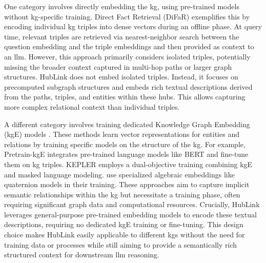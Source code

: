 One category involves directly embedding the \gls{kg}, using pre-trained models without \gls{kg}-specific training. Direct Fact Retrieval (DiFaR) \cite{baek_direct_2023} exemplifies this by encoding individual \gls{kg} triples into dense vectors during an offline phase. At query time, relevant triples are retrieved via nearest-neighbor search between the question embedding and the triple embeddings and then provided as context to an \gls{llm}. However, this approach primarily considers isolated triples, potentially missing the broader context captured in multi-hop paths or larger graph structures. HubLink does not embed isolated triples. Instead, it focuses on precomputed subgraph structures and embeds rich textual descriptions derived from the paths, triples, and entities within these hubs. This allows capturing more complex relational context than individual triples.

A different category involves training dedicated Knowledge Graph Embedding (\gls{kg}E) models \cite{cao_knowledge_2024, pan_unifying_2024}. These methods learn vector representations for entities and relations by training specific models on the structure of the \gls{kg}. For example, Pretrain-\gls{kg}E \cite{zhang_pretrain-kge_2020} integrates pre-trained language models like BERT and fine-tune them on \gls{kg} triples. KEPLER \cite{wang_kepler_2020} employs a dual-objective training combining \gls{kg}E and masked language modeling. \textcite{nayyeri_integrating_2023} use specialized algebraic embeddings like quaternion models in their training. These approaches aim to capture implicit semantic relationships within the \gls{kg} but necessitate a training phase, often requiring significant graph data and computational resources. Crucially, HubLink leverages general-purpose pre-trained embedding models to encode these textual descriptions, requiring no dedicated \gls{kg}E training or fine-tuning. This design choice makes HubLink easily applicable to different \glspl{kg} without the need for training data or processes while still aiming to provide a semantically rich structured context for downstream \gls{llm} reasoning.




